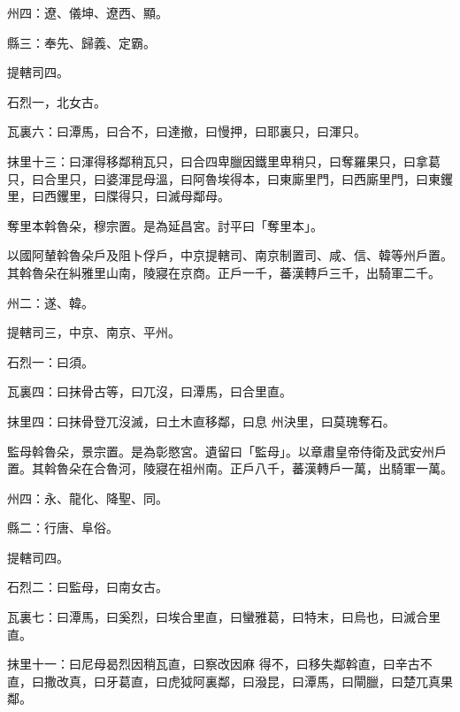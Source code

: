 \begin{pinyinscope}
 州四：遼、儀坤、遼西、顯。



 縣三：奉先、歸義、定霸。



 提轄司四。



 石烈一，北女古。



 瓦裏六：曰潭馬，曰合不，曰達撤，曰慢押，曰耶裏只，曰渾只。



 抹里十三：曰渾得移鄰稍瓦只，曰合四卑臘因鐵里卑稍只，曰奪羅果只，曰拿葛只，曰合里只，曰婆渾昆母溫，曰阿魯埃得本，曰東廝里門，曰西廝里門，曰東钁里，曰西钁里，曰牒得只，曰滅母鄰母。



 奪里本斡魯朵，穆宗置。是為延昌宮。討平曰「奪里本」。



 以國阿輦斡魯朵戶及阻卜俘戶，中京提轄司、南京制置司、咸、信、韓等州戶置。其斡魯朵在糾雅里山南，陵寢在京商。正戶一千，蕃漢轉戶三千，出騎軍二千。



 州二：遂、韓。



 提轄司三，中京、南京、平州。



 石烈一：曰須。



 瓦裏四：曰抹骨古等，曰兀沒，曰潭馬，曰合里直。



 抹里四：曰抹骨登兀沒滅，曰土木直移鄰，曰息
 州決里，曰莫瑰奪石。



 監母斡魯朵，景宗置。是為彰愍宮。遺留曰「監母」。以章肅皇帝侍衛及武安州戶置。其斡魯朵在合魯河，陵寢在祖州南。正戶八千，蕃漢轉戶一萬，出騎軍一萬。



 州四：永、龍化、降聖、同。



 縣二：行唐、阜俗。



 提轄司四。



 石烈二：曰監母，曰南女古。



 瓦裏七：曰潭馬，曰奚烈，曰埃合里直，曰蠻雅葛，曰特末，曰烏也，曰滅合里直。



 抹里十一：曰尼母曷烈因稍瓦直，曰察改因麻
 得不，曰移失鄰斡直，曰辛古不直，曰撒改真，曰牙葛直，曰虎狘阿裏鄰，曰潑昆，曰潭馬，曰閘臘，曰楚兀真果鄰。




\end{pinyinscope}
